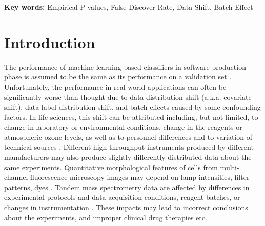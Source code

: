 \documentclass{article}
\begin{document}
\begin{abstract}
	 


\end{abstract}
\textbf{Key words:} Empirical P-values, False Discover Rate, Data Shift, Batch Effect

\section{Introduction}

The performance of machine learning-based classifiers in software production phase is assumed to be the same as its performance on a validation set  \cite{dmlsbook2022}. Unfortunately, the  performance in real world applications can often be significantly worse than thought due to data distribution shift (a.k.a. covariate shift), data label distribution shift, and batch effects \cite{Candela2009DatasetShift} caused by some confounding factors. In life sciences, this shift can be attributed including, but not limited, to change in laboratory or environmental conditions, change in the reagents or atmospheric ozone levels, as well as to personnel differences and to variation of technical sources \cite{leek2010tackling}. Different high-throughput instruments produced by different manufacturers may also produce slightly differently distributed data about the same experiments. Quantitative morphological features of cells from multi-channel fluorescence microscopy images may depend on lamp intensities, filter patterns, dyes \cite{bray2016cell}. Tandem mass spectrometry data are affected by differences in experimental protocols and data acquisition conditions, reagent batches, or changes in instrumentation \cite{phua2022perspectives, vcuklina2021diagnostics}. These impacts may lead to incorrect conclusions about the experiments, and improper clinical drug therapies etc. 
\end{document}
